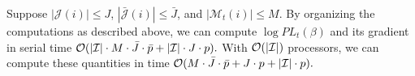 \documentclass[aoas,preprint]{imsart}
\begin{document}
Suppose $|\mathcal{J}(i)| \leq J$, $|\mathcal{\bar J}(i)| \leq \bar J$,
and $|\mathcal{M}_t(i)| \leq M$.  By organizing the computations as described
above, we can compute $\log \mathit{PL}_t(\beta)$ and its gradient in serial
time
\(
    \mathcal{O}(
        | \mathcal{I} |
        \cdot
        M
        \cdot
        \bar J
        \cdot
        \bar p
        +
        |\mathcal{I}| \cdot J \cdot p
    ).
\)
With $\mathcal{O}(|\mathcal{I}|)$ processors, we can compute these quantities in time
\(
    \mathcal{O}(
        M \cdot \bar J \cdot \bar p
        +
        J \cdot p
        +
        |\mathcal{I}| \cdot p
    ).
\)




\end{document}
